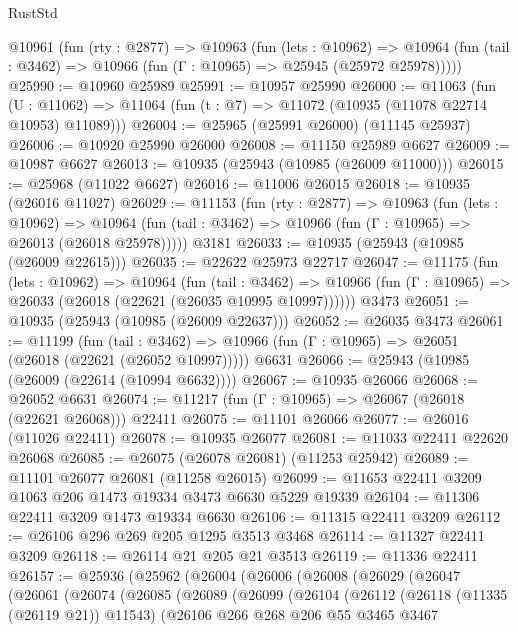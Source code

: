 \begin{lexlean}{RustStd}
\begin{coremodule}
{{{{{{{{{{{{{{{{{{{  @10961
    (fun (rty : @2877) =>
    @10963
      (fun (lets : @10962) =>
      @10964 (fun (tail : @3462) => @10966 (fun (Γ : @10965) => @25945 (@25972 @25978)))))
@25990 := @10960 @25989
@25991 := @10957 @25990
@26000 := @11063
    (fun (U : @11062) => @11064 (fun (t : @7) => @11072 (@10935 (@11078 @22714 @10953) @11089)))
@26004 := @25965 (@25991 @26000) (@11145 @25937)
@26006 := @10920 @25990 @26000
@26008 := @11150 @25989 @6627
@26009 := @10987 @6627
@26013 := @10935 (@25943 (@10985 (@26009 @11000)))
@26015 := @25968 (@11022 @6627)
@26016 := @11006 @26015
@26018 := @10935 (@26016 @11027)
@26029 := @11153
    (fun (rty : @2877) =>
    @10963
      (fun (lets : @10962) =>
      @10964 (fun (tail : @3462) => @10966 (fun (Γ : @10965) => @26013 (@26018 @25978)))))
    @3181
@26033 := @10935 (@25943 (@10985 (@26009 @22615)))
@26035 := @22622 @25973 @22717
@26047 := @11175
    (fun (lets : @10962) =>
    @10964
      (fun (tail : @3462) =>
      @10966 (fun (Γ : @10965) => @26033 (@26018 (@22621 (@26035 @10995 @10997))))))
    @3473
@26051 := @10935 (@25943 (@10985 (@26009 @22637)))
@26052 := @26035 @3473
@26061 := @11199
    (fun (tail : @3462) => @10966 (fun (Γ : @10965) => @26051 (@26018 (@22621 (@26052 @10997)))))
    @6631
@26066 := @25943 (@10985 (@26009 (@22614 (@10994 @6632))))
@26067 := @10935 @26066
@26068 := @26052 @6631
@26074 := @11217 (fun (Γ : @10965) => @26067 (@26018 (@22621 @26068))) @22411
@26075 := @11101 @26066
@26077 := @26016 (@11026 @22411)
@26078 := @10935 @26077
@26081 := @11033 @22411 @22620 @26068
@26085 := @26075 (@26078 @26081) (@11253 @25942)
@26089 := @11101 @26077 @26081 (@11258 @26015)
@26099 := @11653 @22411 @3209 @1063 @206 @1473 @19334 @3473 @6630 @5229 @19339
@26104 := @11306 @22411 @3209 @1473 @19334 @6630
@26106 := @11315 @22411 @3209
@26112 := @26106 @296 @269 @205 @1295 @3513 @3468
@26114 := @11327 @22411 @3209
@26118 := @26114 @21 @205 @21 @3513
@26119 := @11336 @22411
@26157 := @25936
    (@25962
      (@26004
        (@26006
          (@26008
            (@26029
              (@26047
                (@26061
                  (@26074
                    (@26085
                      (@26089
                        (@26099
                          (@26104
                            (@26112
                              (@26118 (@11335 (@26119 @21)) @11543)
                              (@26106
                                @266
                                @268
                                @206
                                @55
                                @3465
                                @3467
}}}}}}}}}}}}}}}}}}}
\end{coremodule}
\end{lexlean}
